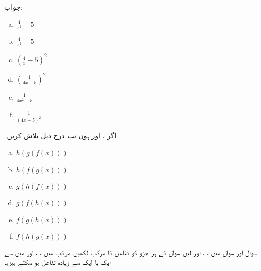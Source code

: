 جواب:
\begin{multicols}{4}
\begin{enumerate}[a.]
\item
$\tfrac{4}{x^2}-5$
\item
$\tfrac{4}{x^2}-5$
\item
$(\tfrac{4}{x}-5)^2$
\item
$(\tfrac{1}{4x-5})^2$
\item
$\tfrac{1}{4x^2-5}$
\item
$\tfrac{1}{(4x-5)^2}$
\end{enumerate}
\end{multicols}
اگر ،  اور  ہوں تب درج ذیل تلاش کریں۔
\begin{multicols}{4}
\begin{enumerate}[a.]
\item
$h(g(f(x)))$
\item
$h(f(g(x)))$
\item
$g(h(f(x)))$
\item
$g(f(h(x)))$
\item
$f(g(h(x)))$
\item
$f(h(g(x)))$
\end{enumerate}
\end{multicols}
سوال  اور سوال  میں ، ،  اور  لیں۔سوال کے ہر جزو کو تفاعل کا مرکب لکھیں۔مرکب میں ، ،  اور  میں سے ایک یا ایک سے زیادہ تفاعل ہو سکتے ہیں۔

